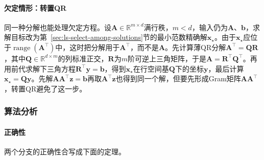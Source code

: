 \paragraph{欠定情形：转置QR}
同一种分解也能处理欠定方程。设$\bm A\in\mathbb R^{m\times d}$满行秩，$m<d$，输入仍为$\bm A$、$\bm b$，求解目标改为第~\ref{sec:ls-select-among-solutions}节的最小范数精确解$\bm x_\star$。由于$\bm x_\star$应位于$\operatorname{range}(\bm A^\top)$中，这时把分解用于$\bm A^\top$，而不是$\bm A$。先计算薄QR分解$\bm A^\top=\bm Q\bm R$，其中$\bm Q\in\mathbb R^{d\times m}$的列标准正交，$\bm R$为$m$阶可逆上三角矩阵，于是$\bm A=\bm R^\top\bm Q^\top$。再用前代求解下三角方程$\bm R^\top\bm y=\bm b$，得到$\bm x_\star$在行空间基$\bm Q$下的坐标$\bm y$，最后计算$\bm x_\star=\bm Q\bm y$。先解$\bm A\bm A^\top\bm z=\bm b$再取$\bm A^\top\bm z$也得到同一个解，但要先形成Gram矩阵$\bm A\bm A^\top$，转置QR避免了这一步。

\subsubsection{算法分析}

\paragraph{正确性}
两个分支的正确性合写成下面的定理。

